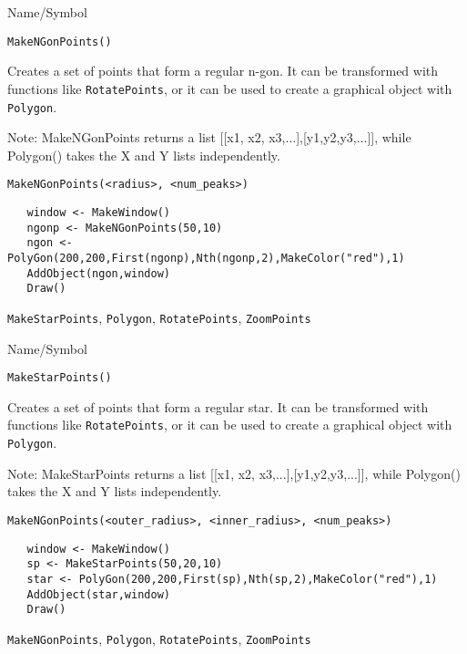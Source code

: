 \begin{desc}{Name/Symbol}
\item[Name/Symbol]	\verb+MakeNGonPoints()+

\item[Description] 
Creates a set of points that form a regular n-gon.  It can be
transformed with functions like \verb+RotatePoints+, or it can be 
used to create a graphical object with \verb+Polygon+.

Note: MakeNGonPoints returns a list [[x1, x2, x3,...],[y1,y2,y3,...]],
while Polygon() takes the X and Y lists independently.


\item[Usage]
\begin{verbatim}
MakeNGonPoints(<radius>, <num_peaks>)
\end{verbatim}

\item[Example]	
\begin{verbatim}
   window <- MakeWindow()
   ngonp <- MakeNGonPoints(50,10)
   ngon <- PolyGon(200,200,First(ngonp),Nth(ngonp,2),MakeColor("red"),1)
   AddObject(ngon,window)
   Draw()
\end{verbatim}

\item[See Also]	
\verb+MakeStarPoints+, \verb+Polygon+, \verb+RotatePoints+, \verb+ZoomPoints+
\end{desc}

\rl


\begin{desc}{Name/Symbol}
\item[Name/Symbol]	\verb+MakeStarPoints()+

\item[Description] 
Creates a set of points that form a regular star.  It can be
transformed with functions like \verb+RotatePoints+, or it can be 
used to create a graphical object with \verb+Polygon+.

Note: MakeStarPoints returns a list [[x1, x2, x3,...],[y1,y2,y3,...]],
while Polygon() takes the X and Y lists independently.

\item[Usage]
\begin{verbatim}
MakeNGonPoints(<outer_radius>, <inner_radius>, <num_peaks>)
\end{verbatim}

\item[Example]	
\begin{verbatim}
   window <- MakeWindow()
   sp <- MakeStarPoints(50,20,10)
   star <- PolyGon(200,200,First(sp),Nth(sp,2),MakeColor("red"),1)
   AddObject(star,window)
   Draw()
\end{verbatim}

\item[See Also]	
\verb+MakeNGonPoints+, \verb+Polygon+, \verb+RotatePoints+, \verb+ZoomPoints+
\end{desc}

